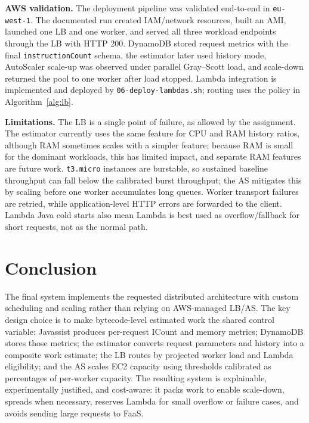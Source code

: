 \documentclass[10pt]{article}
\begin{document}
\textbf{AWS validation.} The deployment pipeline was validated end-to-end in \texttt{eu-west-1}. The documented run created IAM/network resources, built an AMI, launched one LB and one worker, and served all three workload endpoints through the LB with HTTP 200. DynamoDB stored request metrics with the final \texttt{instruction\allowbreak Count} schema, the estimator later used history mode, AutoScaler scale-up was observed under parallel Gray--Scott load, and scale-down returned the pool to one worker after load stopped. Lambda integration is implemented and deployed by \texttt{06-deploy-\allowbreak lambdas.\allowbreak sh}; routing uses the policy in Algorithm~\ref{alg:lb}.

\textbf{Limitations.} The LB is a single point of failure, as allowed by the assignment. The estimator currently uses the same feature for CPU and RAM history ratios, although RAM sometimes scales with a simpler feature; because RAM is small for the dominant workloads, this has limited impact, and separate RAM features are future work. \texttt{t3.micro} instances are burstable, so sustained baseline throughput can fall below the calibrated burst throughput; the AS mitigates this by scaling before one worker accumulates long queues. Worker transport failures are retried, while application-level HTTP errors are forwarded to the client. Lambda Java cold starts also mean Lambda is best used as overflow/fallback for short requests, not as the normal path.

\section{Conclusion}

The final system implements the requested distributed architecture with custom scheduling and scaling rather than relying on AWS-managed LB/AS. The key design choice is to make bytecode-level estimated work the shared control variable: Javassist produces per-request ICount and memory metrics; DynamoDB stores those metrics; the estimator converts request parameters and history into a composite work estimate; the LB routes by projected worker load and Lambda eligibility; and the AS scales EC2 capacity using thresholds calibrated as percentages of per-worker capacity. The resulting system is explainable, experimentally justified, and cost-aware: it packs work to enable scale-down, spreads when necessary, reserves Lambda for small overflow or failure cases, and avoids sending large requests to FaaS.

\balance
\end{document}
